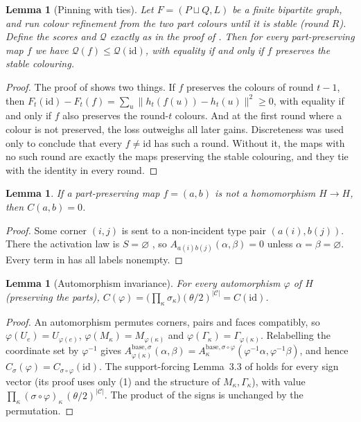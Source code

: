 \documentclass[11pt]{amsart}
\newtheorem{lemma}[theorem]{Lemma}
\theoremstyle{definition}
\theoremstyle{remark}
\newcommand{\1}{\mathbf 1}
\begin{document}
\begin{lemma}[Pinning with ties]\label{lem:ties}
Let $F=(P\sqcup Q,L)$ be a finite bipartite graph, and run colour refinement from the two part colours until
it is stable (round $R$). Define the scores and $\mathcal Q$ exactly as in the proof of \cite[Lemma~3.4]{oai}.
Then for every part-preserving map $f$ we have $\mathcal Q(f)\le\mathcal Q(\mathrm{id})$, with equality if and only if $f$
preserves the stable colouring.
\end{lemma}
\begin{proof}
The proof of \cite[Lemma~3.4]{oai} shows two things. If $f$ preserves the colours of round $t-1$, then
$F_t(\mathrm{id})-F_t(f)=\sum_u\|h_t(f(u))-h_t(u)\|^2\ge0$, with equality if and only if $f$ also
preserves the round-$t$ colours. And at the first round where a colour is not preserved, the loss outweighs
all later gains. Discreteness was used only to conclude that every $f\ne\mathrm{id}$ has such a round. Without
it, the maps with no such round are exactly the maps preserving the stable colouring, and they tie with the
identity in every round.
\end{proof}

\begin{lemma}\label{lem:hom}
If a part-preserving map $f=(a,b)$ is not a homomorphism $H\to H$, then $C(a,b)=0$.
\end{lemma}
\begin{proof}
Some corner $(i,j)$ is sent to a non-incident type pair $(a(i),b(j))$. There the activation law is
$S=\varnothing$ \cite[Section~3.3]{oai}, so $A_{a(i)b(j)}(\alpha,\beta)=0$ unless $\alpha=\beta=\varnothing$. Every term in
\cite[(3.9)]{oai} has all labels nonempty.
\end{proof}

\begin{lemma}[Automorphism invariance]\label{lem:aut}
For every automorphism $\varphi$ of $H$ (preserving the parts),
$C(\varphi)=\bigl(\prod_\kappa\sigma_\kappa\bigr)(\theta/2)^{|\mathscr C|}=C(\mathrm{id})$.
\end{lemma}
\begin{proof}
An automorphism permutes corners, pairs and faces compatibly, so $\varphi(U_e)=U_{\varphi(e)}$,
$\varphi(M_\kappa)=M_{\varphi(\kappa)}$ and $\varphi(\Gamma_\kappa)=\Gamma_{\varphi(\kappa)}$. Relabelling the coordinate set by $\varphi^{-1}$
gives $A^{\mathrm{base},\sigma}_{\varphi(\kappa)}(\alpha,\beta)=A^{\mathrm{base},\sigma\circ\varphi}_{\kappa}(\varphi^{-1}\alpha,\varphi^{-1}\beta)$, and hence
$C_\sigma(\varphi)=C_{\sigma\circ\varphi}(\mathrm{id})$. The support-forcing Lemma~3.3 of \cite{oai} holds for every sign vector
(its proof uses only (1) and the structure of $M_\kappa,\Gamma_\kappa$), with value $\prod_\kappa(\sigma\circ\varphi)_\kappa\,(\theta/2)^{|\mathscr C|}$. The
product of the signs is unchanged by the permutation.
\end{proof}
\end{document}
